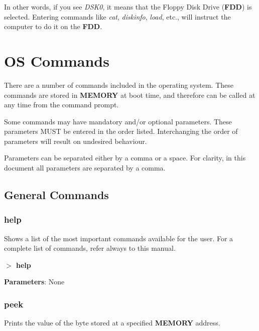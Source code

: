 \documentclass[a4paper,11pt]{article}
\begin{document}
    In other words, if you see \textit{DSK0}, it means that the Floppy Disk Drive
    (\textbf{FDD}) is selected. Entering commands like \textit{cat},
    \textit{diskinfo}, \textit{load}, etc., will instruct the computer to do it
    on the \textbf{FDD}.

    \pagebreak
    \section{OS Commands}
    There are a number of commands included in the operating system. These
    commands are stored in \textbf{MEMORY} at boot time, and therefore can be
    called at any time from the command prompt.

    Some commands may have mandatory and/or optional parameters. These
    parameters MUST be entered in the order listed. Interchanging the order of
    parameters will result on undesired behaviour.

    Parameters can be separated either by a comma or a space. For clarity, in
    this document all parameters are separated by a comma.

    \subsection{General Commands}\label{gencmds}
        \subsubsection{{\color{blue}help}}
        Shows a list of the most important commands available for the user.
        For a complete list of commands, refer always to this manual.

        \hspace{1.9cm}\textbf{$>$ help}

        \textbf{Parameters}: None

        \subsubsection{{\color{blue}peek}}
        Prints the value of the byte stored at a specified \textbf{MEMORY}
        address.
\end{document}
